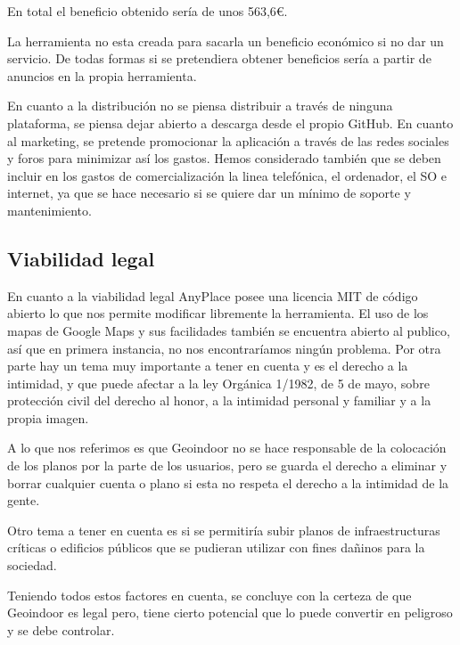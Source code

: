 En total el beneficio obtenido sería de unos 563,6\euro.

La herramienta no esta creada para sacarla un beneficio económico si no dar un servicio. De todas formas si se pretendiera obtener beneficios sería a partir de anuncios en la propia herramienta.

En cuanto a la distribución no se piensa distribuir a través de ninguna plataforma, se piensa dejar abierto a descarga desde el propio GitHub. En cuanto al marketing, se pretende promocionar la aplicación a través de las redes sociales y foros para minimizar así los gastos.
Hemos considerado también que se deben incluir en los gastos de comercialización la linea telefónica, el ordenador, el SO e internet, ya que se hace necesario si se quiere dar un mínimo de soporte y mantenimiento.  
 

\subsection{Viabilidad legal}

En cuanto a la viabilidad legal AnyPlace posee una licencia MIT de código abierto lo que nos permite modificar libremente la herramienta. El uso de los mapas de Google Maps y sus facilidades también se encuentra abierto al publico, así que en primera instancia, no nos encontraríamos ningún problema.  Por otra parte hay un tema muy importante a tener en cuenta y es el derecho a la intimidad, y que puede afectar a la ley Orgánica 1/1982, de 5 de mayo, sobre protección civil del derecho al honor, a la intimidad personal y familiar y a la propia imagen.

A lo que nos referimos es que Geoindoor no se hace responsable de la colocación de los planos por la parte de los usuarios, pero se guarda el derecho a eliminar y borrar cualquier cuenta o plano si esta no respeta el derecho a la intimidad de la gente.

Otro tema a tener en cuenta es si se permitiría subir planos de infraestructuras críticas o edificios públicos que se pudieran utilizar con fines dañinos para la sociedad.

Teniendo todos estos factores en cuenta, se concluye con la certeza de que Geoindoor es legal pero, tiene cierto potencial que lo puede convertir en peligroso y se debe controlar.
